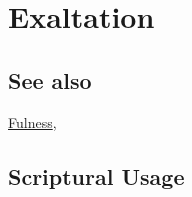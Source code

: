 \section{Exaltation}
	\label{EXALTATION}
	
\subsection{See also}

	\hyperref[FULNESS]{Fulness}, 





\subsection{Scriptural Usage} %
	\label{EXALTATION-SCRIPTURES}

	
	
